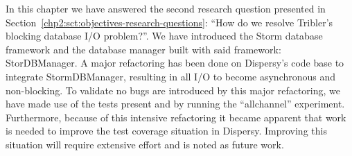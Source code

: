 In this chapter we have answered the second research question presented in Section~\ref{chp2:sct:objectives-research-questions}: \enquote{How do we resolve Tribler's blocking database I/O problem?}.
We have introduced the Storm database framework and the database manager built with said framework: StorDBManager.
A major refactoring has been done on Dispersy's code base to integrate StormDBManager, resulting in all I/O to become asynchronous and non-blocking.
To validate no bugs are introduced by this major refactoring, we have made use of the tests present and by running the \enquote{allchannel} experiment.
Furthermore, because of this intensive refactoring it became apparent that work is needed to improve the test coverage situation in Dispersy.
Improving this situation will require extensive effort and is noted as future work.
 
